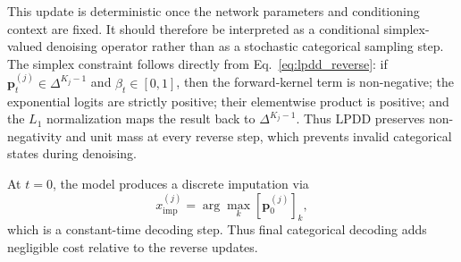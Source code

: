 \documentclass[times, review, 10pt]{elsarticle}
\begin{document}
This update is deterministic once the network parameters and conditioning
context are fixed. It should therefore be interpreted as a conditional
simplex-valued denoising operator rather than as a stochastic categorical
sampling step. The simplex constraint follows directly from
Eq.~\eqref{eq:lpdd_reverse}: if $\mathbf{p}_t^{(j)}\in\Delta^{K_j-1}$ and
$\beta_t\in[0,1]$, then the forward-kernel term is non-negative; the
exponential logits are strictly positive; their elementwise product is
positive; and the $L_1$ normalization maps the result back to
$\Delta^{K_j-1}$. Thus LPDD preserves non-negativity and unit mass at every
reverse step, which prevents invalid categorical states during denoising.

At $t=0$, the model produces a discrete imputation via
\[
x^{(j)}_{\text{imp}} = \arg\max_k [\mathbf{p}_0^{(j)}]_k,
\]
which is a constant-time decoding step. Thus final categorical decoding adds
negligible cost relative to the reverse updates.









\end{document}
